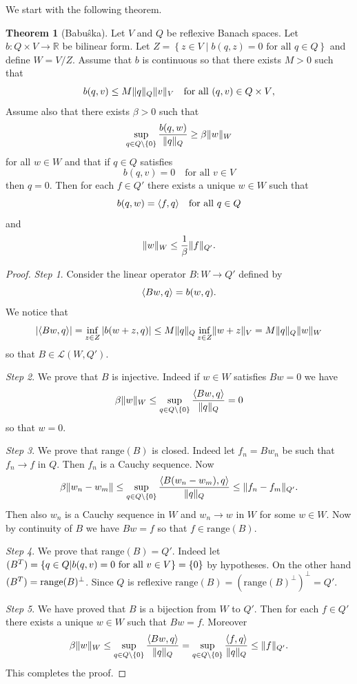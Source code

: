 \documentclass[a4paper,10pt,twoside]{amsbook}
\numberwithin{section}{chapter}
\numberwithin{equation}{chapter}
\theoremstyle{definition}
\newtheorem{thm}[prop]{Theorem}
\DeclarePairedDelimiter{\norm}{\lVert}{\rVert}
\DeclarePairedDelimiter{\dual}{\langle}{\rangle}
\begin{document}
We start with the following theorem.
\begin{thm}[Babu\^ska]
\label{thm:babuska}
Let $V$ and $Q$ be reflexive Banach spaces. Let $b\colon Q\times V\to\mathbb{R}$ be bilinear form. Let $Z=\left\{z\in V\middle|\text{$b(q,z)=0$ for all $q\in Q$}\right\}$ and define $W=V/Z$. Assume that $b$ is continuous so that there exists $M>0$ such that
\[
b(q,v)\le M\norm{q}_Q\norm{v}_V\quad\text{for all $(q,v)\in Q\times V$},
\]
Assume also that there exists $\beta>0$ such that
\[
\sup_{q\in Q\setminus\{0\}}\frac{b(q,w)}{\norm{q}_Q}\ge\beta\norm{w}_W
\]
for all $w\in W$ and that if $q\in Q$ satisfies
\[
b(q,v)=0\quad\text{for all $v\in V$}
\]
then $q=0$. Then for each $f\in Q'$ there exists a unique $w\in W$ such that
\[
b(q,w)=\dual{f,q}\quad\text{for all $q\in Q$}
\]
and
\[
\norm{w}_W\le\frac{1}{\beta}\norm{f}_{Q'}.
\]
\end{thm}
\begin{proof}
\emph{Step 1}. Consider the linear operator $B\colon W\to Q'$ defined by
\[
\dual{Bw,q}=b(w,q).
\]
We notice that
\[
|\dual{Bw,q}|=\inf_{z\in Z}|b(w+z,q)|\le M\norm{q}_Q\inf_{z\in Z}\norm{w+z}_V=M\norm{q}_Q\norm{w}_W
\]
so that $B\in\mathscr{L}(W,Q')$.

\emph{Step 2}. We prove that $B$ is injective. Indeed if $w\in W$ satisfies $Bw=0$ we have
\[
\beta\norm{w}_W\le\sup_{q\in Q\setminus\{0\}}\frac{\dual{Bw,q}}{\norm{q}_Q}=0
\]
so that $w=0$.

\emph{Step 3}. We prove that $\text{range}(B)$ is closed. Indeed let $f_n=Bw_n$ be such that $f_n\to f$ in $Q$. Then $f_n$ is a Cauchy sequence. Now
\[
\beta\norm{w_n-w_m}\le\sup_{q\in Q\setminus\{0\}}\frac{\dual{B(w_n-w_m),q}}{\norm{q}_Q}\le\norm{f_n-f_m}_{Q'}.
\]
Then also $w_n$ is a Cauchy sequence in $W$ and $w_n\to w$ in $W$ for some $w\in W$. Now by continuity of $B$ we have $Bw=f$ so that $f\in\text{range}(B)$.

\emph{Step 4}. We prove that $\text{range}(B)=Q'$. Indeed let $\null(B^T)=\left\{q\in Q\middle|\text{$b(q,v)=0$ for all $v\in V$}\right\}=\{0\}$ by hypotheses. On the other hand $\null(B^T)=\text{range}(B)^\perp$. Since $Q$ is reflexive $\text{range}(B)=(\text{range}(B)^\perp)^\perp=Q'$.

\emph{Step 5}. We have proved that $B$ is a bijection from $W$ to $Q'$. Then for each $f\in Q'$ there exists a unique $w\in W$ such that $Bw=f$. Moreover
\[
\beta\norm{w}_W\le\sup_{q\in Q\setminus\{0\}}\frac{\dual{Bw,q}}{\norm{q}_Q}=\sup_{q\in Q\setminus\{0\}}\frac{\dual{f,q}}{\norm{q}_Q}\le\norm{f}_{Q'}.
\]
This completes the proof.
\end{proof}
\end{document}
